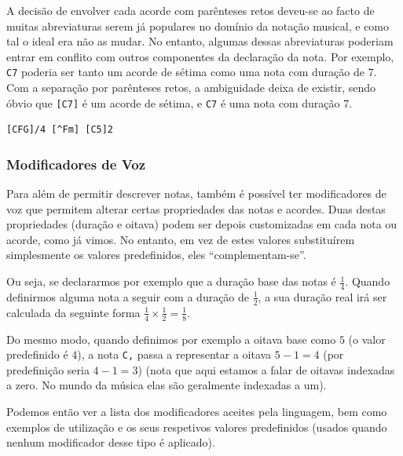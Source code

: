 A decisão de envolver cada acorde com parênteses retos deveu-se ao facto de muitas abreviaturas serem já populares no domínio da notação musical, e como tal o ideal era não as mudar. No entanto, algumas dessas abreviaturas poderiam entrar em conflito com outros componentes da declaração da nota. Por exemplo, \texttt{C7} poderia ser tanto um acorde de sétima como uma nota com duração de 7. Com a separação por parênteses retos, a ambiguidade deixa de existir, sendo óbvio que \texttt{[C7]} é um acorde de sétima, e \texttt{C7} é uma nota com duração 7.

\begin{lstlisting}[caption={Exemplos de três definições de acordes possíveis}] 
[CFG]/4 [^Fm] [C5]2
\end{lstlisting}

\subsubsection{\textbf{Modificadores de Voz}}

Para além de permitir descrever notas, também é possível ter modificadores de voz que permitem alterar certas propriedades das notas e acordes. Duas destas propriedades (duração e oitava) podem ser depois customizadas em cada nota ou acorde, como já vimos. No entanto, em vez de estes valores substituírem simplesmente os valores predefinidos, eles ``complementam-se''.

Ou seja, se declararmos por exemplo que a duração base das notas é $\frac{1}{4}$. Quando definirmos alguma nota a seguir com a duração de $\frac{1}{2}$, a sua duração real irá ser calculada da seguinte forma $\frac{1}{4} \times \frac{1}{2} = \frac{1}{8}$.

Do mesmo modo, quando definimos por exemplo a oitava base como $5$ (o valor predefinido é $4$), a nota \texttt{C,} passa a representar a oitava $5 - 1 = 4$ (por predefinição seria $4 - 1 = 3$) (nota que aqui estamos a falar de oitavas indexadas a zero. No mundo da música elas são geralmente indexadas a um).

Podemos então ver a lista dos modificadores aceites pela linguagem, bem como exemplos de utilização e os seus respetivos valores predefinidos (usados quando nenhum modificador desse tipo é aplicado).

